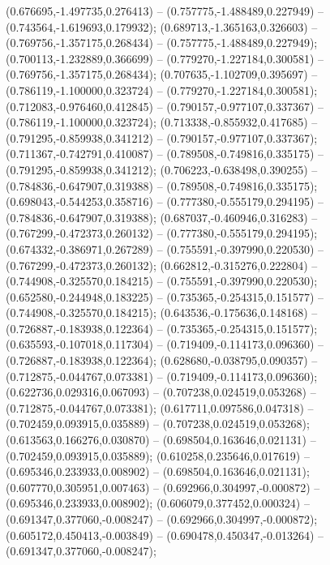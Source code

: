  (0.676695,-1.497735,0.276413) -- (0.757775,-1.488489,0.227949) -- (0.743564,-1.619693,0.179932);
 (0.689713,-1.365163,0.326603) -- (0.769756,-1.357175,0.268434) -- (0.757775,-1.488489,0.227949);
 (0.700113,-1.232889,0.366699) -- (0.779270,-1.227184,0.300581) -- (0.769756,-1.357175,0.268434);
 (0.707635,-1.102709,0.395697) -- (0.786119,-1.100000,0.323724) -- (0.779270,-1.227184,0.300581);
 (0.712083,-0.976460,0.412845) -- (0.790157,-0.977107,0.337367) -- (0.786119,-1.100000,0.323724);
 (0.713338,-0.855932,0.417685) -- (0.791295,-0.859938,0.341212) -- (0.790157,-0.977107,0.337367);
 (0.711367,-0.742791,0.410087) -- (0.789508,-0.749816,0.335175) -- (0.791295,-0.859938,0.341212);
 (0.706223,-0.638498,0.390255) -- (0.784836,-0.647907,0.319388) -- (0.789508,-0.749816,0.335175);
 (0.698043,-0.544253,0.358716) -- (0.777380,-0.555179,0.294195) -- (0.784836,-0.647907,0.319388);
 (0.687037,-0.460946,0.316283) -- (0.767299,-0.472373,0.260132) -- (0.777380,-0.555179,0.294195);
 (0.674332,-0.386971,0.267289) -- (0.755591,-0.397990,0.220530) -- (0.767299,-0.472373,0.260132);
 (0.662812,-0.315276,0.222804) -- (0.744908,-0.325570,0.184215) -- (0.755591,-0.397990,0.220530);
 (0.652580,-0.244948,0.183225) -- (0.735365,-0.254315,0.151577) -- (0.744908,-0.325570,0.184215);
 (0.643536,-0.175636,0.148168) -- (0.726887,-0.183938,0.122364) -- (0.735365,-0.254315,0.151577);
 (0.635593,-0.107018,0.117304) -- (0.719409,-0.114173,0.096360) -- (0.726887,-0.183938,0.122364);
 (0.628680,-0.038795,0.090357) -- (0.712875,-0.044767,0.073381) -- (0.719409,-0.114173,0.096360);
 (0.622736,0.029316,0.067093) -- (0.707238,0.024519,0.053268) -- (0.712875,-0.044767,0.073381);
 (0.617711,0.097586,0.047318) -- (0.702459,0.093915,0.035889) -- (0.707238,0.024519,0.053268);
 (0.613563,0.166276,0.030870) -- (0.698504,0.163646,0.021131) -- (0.702459,0.093915,0.035889);
 (0.610258,0.235646,0.017619) -- (0.695346,0.233933,0.008902) -- (0.698504,0.163646,0.021131);
 (0.607770,0.305951,0.007463) -- (0.692966,0.304997,-0.000872) -- (0.695346,0.233933,0.008902);
 (0.606079,0.377452,0.000324) -- (0.691347,0.377060,-0.008247) -- (0.692966,0.304997,-0.000872);
 (0.605172,0.450413,-0.003849) -- (0.690478,0.450347,-0.013264) -- (0.691347,0.377060,-0.008247);
